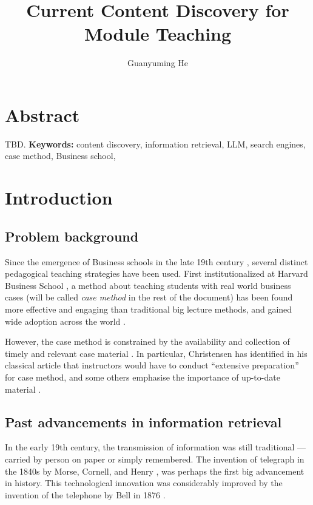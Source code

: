 \documentclass[project-plan]{report-template}
\title{Current Content Discovery for Module Teaching}
\author{Guanyuming He}
\newcommand\casemethod{case method}
\begin{document}
\maketitlepage  

\section*{Abstract}
TBD.
\textbf{Keywords:} content discovery, information retrieval, LLM, search engines, \casemethod, Business school,

\section{Introduction}
\subsection{Problem background}
Since the emergence of Business schools in the late 19th century
\cite{first.bis.school.1, first.bis.school.2}, several distinct pedagogical
teaching strategies have been used.  First institutionalized at Harvard
Business School \cite{case.method.origin.1, case.method.origin.2}, a method
about teaching students with real world business cases (will be called
\emph{\casemethod} in the rest of the document) has been found more effective
and engaging \cite{case.method.support.1, case.method.support.2,
case.method.support.3} than traditional big lecture methods, and gained wide
adoption across the world \cite{case.method.adoption.1,
case.method.adoption.2}.

However, the case method is constrained by the availability and
collection of timely and relevant case material \cite{case.method.limit.1,
case.method.limit.3}. In particular, Christensen has identified in his classical
article that instructors would have to conduct ``extensive preparation''
\cite{case.method.limit.2} for case method, and some others emphasise the
importance of up-to-date material \cite{case.method.limit.4,case.method.limit.5}.

\subsection{Past advancements in information retrieval}
In the early 19th century, the transmission of information was still
traditional --- carried by person on paper or simply remembered. The invention
of telegraph in the 1840s by Morse, Cornell, and Henry
\cite{history.telegraph.1, history.telegraph.2}, was perhaps the first big
advancement in history. This technological innovation was considerably improved
by the invention of the telephone by Bell in 1876 \cite{history.telephone.1,
history.telephone.2}.
\end{document}

